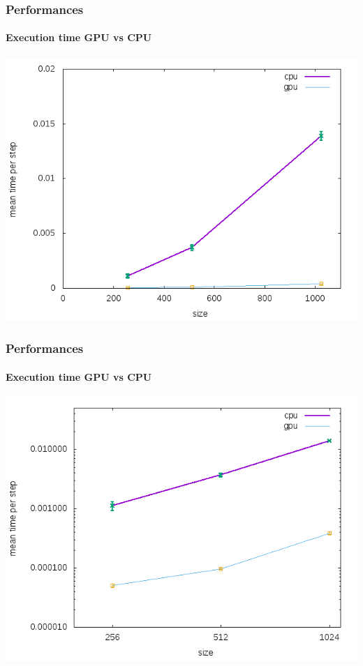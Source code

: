 \begin{frame}
\frametitle{Performances}
\framesubtitle{Execution time GPU vs CPU}
\begin{center}
\includegraphics[scale=0.4]{../check/cpu/speed1.png}
\end{center}
\end{frame}

\begin{frame}
\frametitle{Performances}
\framesubtitle{Execution time GPU vs CPU}
\begin{center}
\includegraphics[scale=0.4]{../check/cpu/speed.png}
\end{center}
\end{frame}

